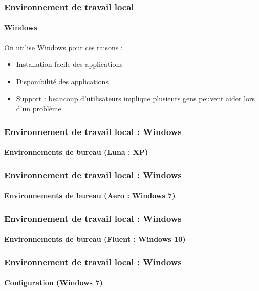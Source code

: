 \documentclass[xcolor=table]{beamer}
\begin{document}
\begin{frame}
\frametitle{Environnement de travail local}
\framesubtitle{Windows}

On utilise Windows pour ces raisons :
\begin{itemize}
	\item Installation facile des applications
	\item Disponibilité des applications 
	\item Support : beaucoup d'utilisateurs implique plusieurs gens peuvent aider lors d'un problème
\end{itemize}

\end{frame}

\begin{frame}
\frametitle{Environnement de travail local : Windows}
\framesubtitle{Environnements de bureau (Luna : XP)}

\begin{center}
\end{center}

\end{frame}

\begin{frame}
\frametitle{Environnement de travail local : Windows}
\framesubtitle{Environnements de bureau (Aero : Windows 7)}

\begin{center}
\end{center}

\end{frame}

\begin{frame}
\frametitle{Environnement de travail local : Windows}
\framesubtitle{Environnements de bureau (Fluent : Windows 10)}

\begin{center}
\end{center}

\end{frame}

\begin{frame}
\frametitle{Environnement de travail local : Windows}
\framesubtitle{Configuration (Windows 7)}

\begin{center}
\end{center}

\end{frame}
\end{document}
